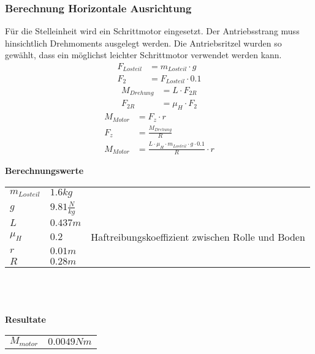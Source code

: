 \subsubsection{Berechnung Horizontale Ausrichtung}
Für die Stelleinheit wird ein Schrittmotor eingesetzt. Der Antriebsstrang muss 
hinsichtlich Drehmoments ausgelegt werden. Die Antriebsritzel wurden so gewählt, 
dass ein möglichst leichter Schrittmotor verwendet werden kann. 
\begin{align}
    F_{Losteil} &= m_{Losteil} \cdot g\\
    F_2 &= F_{Losteil} \cdot 0.1
\end{align}
\begin{align}
    M_{Drehung} &= L \cdot F_{2R}\\
    F_{2R} &= \mu_H \cdot F_2
\end{align}
\begin{align}
    M_{Motor} &= F_z \cdot r\\
    F_z &= \frac{M_{Drehung}}{R}\\
    M_{Motor} &=\frac{L \cdot \mu_H \cdot m_{Losteil} \cdot g \cdot 0.1}{R} \cdot r
\end{align}

\textbf{Berechnungswerte}\\
\begin{tabular}{lll}
	\rule{0pt}{11pt} $m_{Losteil}$ & $1.6 kg$ & \\
	\rule{0pt}{11pt} $g$ & $9.81 \frac{N}{kg}$ & \\
	\rule{0pt}{11pt} $L$ & $0.437 m$ &  \\
	\rule{0pt}{11pt} $\mu_H$ & $0.2$ & Haftreibungskoeffizient zwischen Rolle und Boden \\
	\rule{0pt}{11pt} $r$ & $0.01 m$ & \\
	\rule{0pt}{11pt} $R$ & $0.28 m$ & \\
\end{tabular}\\
\\
\\
\textbf{Resultate}\\
\begin{tabular}{ll}
	\rule{0pt}{11pt} $M_{motor}$ & $0.0049Nm$ \\
\end{tabular}